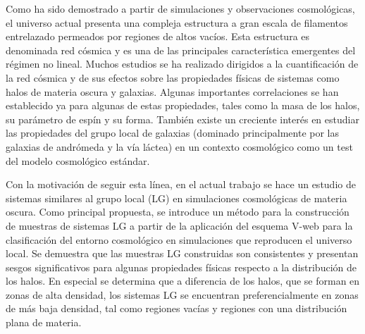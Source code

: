 

\begin{abstracts}


Como ha sido demostrado a partir de simulaciones y observaciones 
cosmológicas, el universo actual presenta una compleja estructura a gran
escala de filamentos entrelazado permeados por regiones de altos vacíos.
Esta estructura es denominada red cósmica y es una de las principales 
característica emergentes del régimen no lineal. Muchos estudios se ha
realizado dirigidos a la cuantificación de la red cósmica y de sus 
efectos sobre las propiedades físicas de sistemas como halos de materia 
oscura y galaxias. Algunas importantes correlaciones se han establecido
ya para algunas de estas propiedades, tales como la masa de los halos, su
parámetro de espín y su forma. También existe un creciente interés en 
estudiar las propiedades del grupo local de galaxias (dominado principalmente 
por las galaxias de andrómeda y la vía láctea) en un contexto cosmológico 
como un test del modelo cosmológico estándar.


Con la motivación de seguir esta línea, en el actual trabajo se hace un
estudio de sistemas similares al grupo local (LG) en simulaciones cosmológicas 
de materia oscura. Como principal propuesta, se introduce un método para la 
construcción de muestras de sistemas LG a partir de la aplicación del esquema
V-web para la clasificación del entorno cosmológico en simulaciones 
que reproducen el universo local. Se demuestra que las muestras LG construidas
son consistentes y presentan sesgos significativos para algunas propiedades 
físicas respecto a la distribución de los halos. En especial se determina que
a diferencia de los halos, que se forman en zonas de alta densidad, los 
sistemas LG se encuentran preferencialmente en zonas de más baja densidad,
tal como regiones vacías y regiones con una distribución plana de materia.


\end{abstracts}


